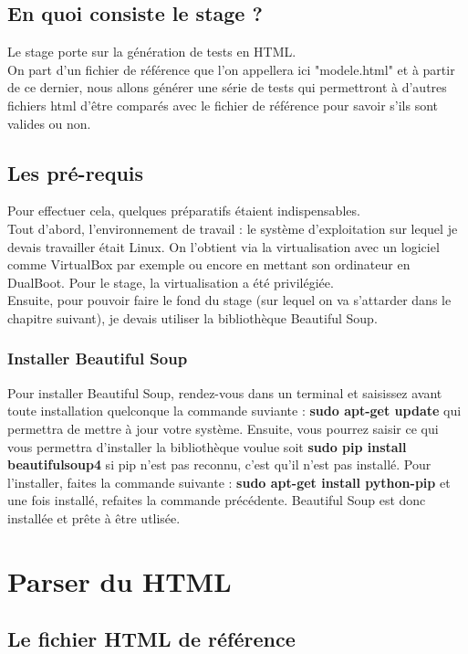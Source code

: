 \documentclass[12pt,twoside]{report}
\begin{document}
\section {En quoi consiste le stage ?}
Le stage porte sur la génération de tests en HTML.\\On part d'un fichier de référence que l'on appellera ici "modele.html" et à partir de ce dernier, nous allons générer une série de tests qui permettront à d'autres fichiers html d'être comparés avec le fichier de référence pour savoir s'ils sont valides ou non.
\section {Les pré-requis}
Pour effectuer cela, quelques préparatifs étaient indispensables.\\
Tout d'abord, l'environnement de travail : le système d'exploitation sur lequel je devais travailler était Linux. On l'obtient via la virtualisation avec un logiciel comme VirtualBox par exemple ou encore en mettant son ordinateur en DualBoot. Pour le stage, la virtualisation a été privilégiée.\\Ensuite, pour pouvoir faire le fond du stage (sur lequel on va s'attarder dans le chapitre suivant), je devais utiliser la bibliothèque Beautiful Soup.
\subsection{Installer Beautiful Soup}
Pour installer Beautiful Soup, rendez-vous dans un terminal et saisissez avant toute installation quelconque la commande suviante : \textbf{sudo apt-get update} qui permettra de mettre à jour votre système. Ensuite, vous pourrez saisir ce qui vous permettra d'installer la bibliothèque voulue soit \textbf{sudo pip install beautifulsoup4} si pip n'est pas reconnu, c'est qu'il n'est pas installé. Pour l'installer, faites la commande suivante : \textbf{sudo apt-get install python-pip} et une fois installé, refaites la commande précédente. Beautiful Soup est donc installée et prête à être utlisée.

\newpage
\color{red}
\chapter{Parser du HTML}
\color{black}
\section{Le fichier HTML de référence}
\end{document}
